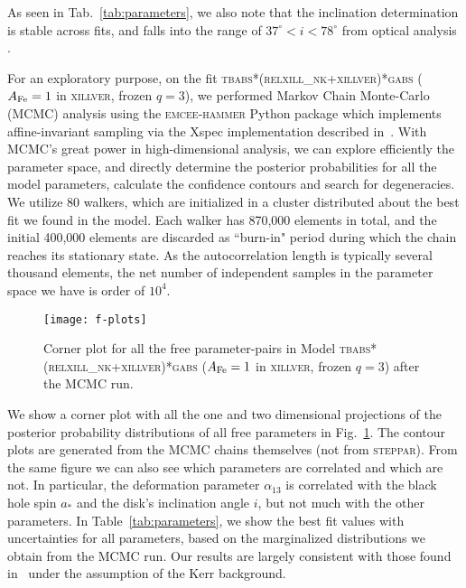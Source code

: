\documentclass[11pt,a4paper,pdftex]{article}
\begin{document}
As seen in Tab.~\ref{tab:parameters}, we also note that the inclination determination is stable across fits, and falls into the range of $37^\circ<i<78^\circ$ from optical analysis \cite{optical}. 

For an exploratory purpose, on the fit \textsc{tbabs*(relxill\_nk+xillver)*gabs} ($A_{\rm Fe}=1$ in \textsc{xillver}, frozen $q=3$), we performed Markov Chain Monte-Carlo (MCMC) analysis using the \textsc{emcee-hammer} Python package \cite{foreman} which implements affine-invariant sampling via the {\sc Xspec} implementation described in~\cite{lmcx1}. With MCMC's great power in high-dimensional analysis, we can explore efficiently the parameter space, and directly determine the posterior probabilities for all the model parameters, calculate the confidence contours  and search for degeneracies. We utilize 80 walkers, which are initialized in a cluster distributed about the best fit we found in the model. Each walker has 870,000 elements in total, and the initial 400,000 elements are discarded as ``burn-in" period during which the chain reaches its stationary state. As the autocorrelation length is typically several thousand elements, the net number of independent samples in the parameter space we have is order of $10^4$. 

\begin{figure*}
\begin{center}
\texttt{[image: f-plots]}
\end{center}
\vspace{-0.8cm}
\caption{Corner plot for all the free parameter-pairs in Model \textsc{tbabs*(relxill\_nk+xillver)*gabs} ($A_{\rm Fe}=1$ in \textsc{xillver}, frozen $q=3$) after the MCMC run. \label{fig:corner}}
\end{figure*}

We show a corner plot with all the one and two dimensional projections of the posterior probability distributions of all free parameters in Fig.~\ref{fig:corner}. The contour plots are generated from the MCMC chains themselves (not from \textsc{steppar}). From the same figure we can also see which parameters are correlated and which are not. In particular, the deformation parameter $\alpha_{13}$ is correlated with the black hole spin $a_*$ and the disk's inclination angle $i$, but not much with the other parameters. In Table~\ref{tab:parameters}, we show the best fit values with uncertainties for all parameters, based on the marginalized distributions we obtain from the MCMC run. Our results are largely consistent with those found in~\cite{javier_gx339} under the assumption of the Kerr background.
\end{document}
